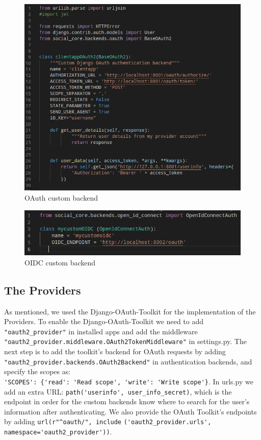 \begin{figure}[htb]
	\centering
	\includegraphics[scale=0.5]{figures/clientapp.png}
	\caption{OAuth custom backend}
\end{figure}


\begin{figure}[htb]
	\centering
	\includegraphics[scale=0.6]{figures/customOIDC.png}
	\caption{OIDC custom backend}
\end{figure}


\subsection{The Providers}

As mentioned, we used the Django-OAuth-Toolkit for the implementation of the Providers. To enable the Django-OAuth-Toolkit we need to add \verb|"oauth2_provider"| in installed apps and add the middleware \verb|"oauth2_provider.middleware.OAuth2TokenMiddleware"| in settings.py. The next step is to add the toolkit's backend for OAuth requests by adding \verb|"oauth2_provider.backends.OAuth2Backend"| in authentication backends, and specify the scopes as: \\ \verb|'SCOPES': {'read': 'Read scope', 'write': 'Write scope'}|.
In urls.py we add an extra URL: \verb|path('userinfo', user_info_secret)|, which is the endpoint in order for the custom backends know where to search for the user's information after authenticating. We also provide the OAuth Toolkit's endpoints by adding \verb|url(r"^oauth/", include| \verb|('oauth2_provider.urls', namespace='oauth2_provider'))|.



